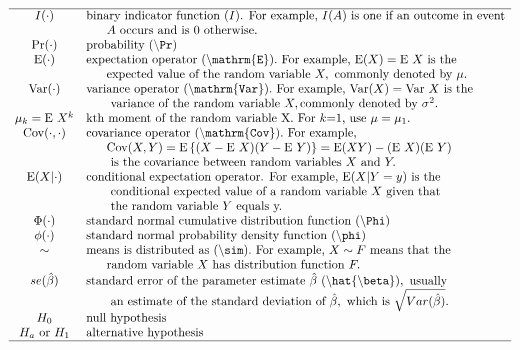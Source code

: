 \documentclass[
]{book}
\begin{document}
\[
\begin{array}{cl}  \hline
I(\cdot) & \text{binary indicator function (}I\text{). For example, }I(A) \text{ is one if an outcome in event} \\
& \ \ \ \ \  A \text{ occurs and is 0 otherwise.} \\
\Pr(\cdot) & \text{probability }(\backslash{\tt{Pr}}) \\
\mathrm{E}(\cdot)  & {\text{expectation operator }} (\backslash{\tt{mathrm\{E\}}}). {\text{ For example, }} \mathrm{E}(X)=\mathrm{E}~X {\text{ is the }} \\
& \ \ \ \ \ {\text{expected value of the random variable }}X,{\text{ commonly denoted by }}\mu. \\
\mathrm{Var}(\cdot)  & \text{variance operator }(\backslash{\tt{mathrm\{Var\}}}). \text{ For example, } \mathrm{Var}(X)=\mathrm{Var}~X\text{ is the} \\
& \ \ \ \ \  \text{ variance of the random variable } X, \text{commonly denoted by } \sigma^2. \\
\mu_k = \mathrm{E}~X^k & \text{kth moment of the random variable X. For }k\text{=1, use }\mu = \mu_1. \\
\mathrm{Cov}(\cdot,\cdot)  & \text{covariance operator } (\backslash{\tt{mathrm\{Cov\}}}).\text{ For example, } \\
& \ \ \ \ \ \mathrm{Cov}(X,Y)=\mathrm{E}\left\{(X -\mathrm{E}~X)(Y-\mathrm{E}~Y)\right\}  =\mathrm{E}(XY) -(\mathrm{E}~X)(\mathrm{E}~Y)\\
& \ \ \ \ \  \text{ is the covariance between random variables }X\text{ and }Y. \\
\mathrm{E}(X | \cdot)  & \text{conditional expectation operator. For example, }\mathrm{E}(X |Y=y) \text{ is the}\\
& \ \ \ \ \   \text{ conditional expected value of a random variable }X\text{ given that }\\
& \ \ \ \ \   \text{ the random variable }Y\text{ equals y. }\\
\Phi(\cdot) & \text{standard normal cumulative distribution function }(\backslash{\tt{Phi}})\\
\phi(\cdot) & \text{standard normal probability density function }(\backslash{\tt{phi}})\\
\sim & \text{means is distributed as }(\backslash{\tt{sim}}). \text{ For example, }X\sim F \text{ means that the } \\
& \ \ \ \ \  \text{random variable } X \text{ has distribution function }F. \\
se(\hat{\beta}) & \text{standard error of the parameter estimate }\hat{\beta} ~ (\backslash{\tt{hat\{}}\backslash{\tt{beta\}}}), \text{ usually }\\
& \ \ \ \ \  \text{ an estimate of the standard deviation of }\hat{\beta},\text{ which is }\sqrt{Var(\hat{\beta})}. \\
H_0 &  \text{null hypothesis} \\
H_a \text{ or }H_1 & \text{alternative hypothesis} \\
\hline
\end{array}
\]
\end{document}
